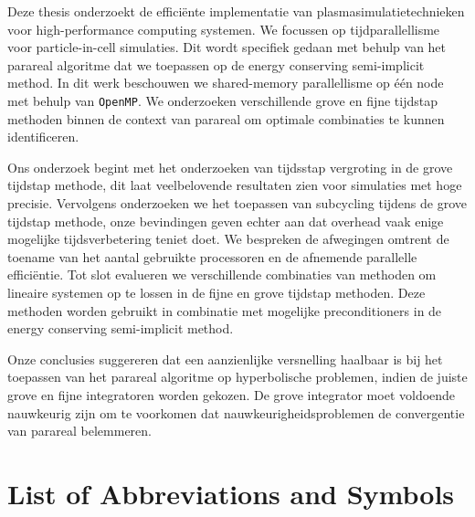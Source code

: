 \documentclass[master=wit, english]{kulemt}
\begin{document}
\begin{abstract*}
Deze thesis onderzoekt de efficiënte implementatie van plasmasimulatietechnieken voor high-performance computing systemen. We focussen op tijdparallellisme voor particle-in-cell simulaties. Dit wordt specifiek gedaan met behulp van het parareal algoritme dat we toepassen op de energy conserving semi-implicit method. In dit werk beschouwen we shared-memory parallellisme op één node met behulp van \texttt{OpenMP}. We onderzoeken verschillende grove en fijne tijdstap methoden binnen de context van parareal om optimale combinaties te kunnen identificeren.

Ons onderzoek begint met het onderzoeken van tijdsstap vergroting in de grove tijdstap methode, dit laat veelbelovende resultaten zien voor simulaties met hoge precisie. Vervolgens onderzoeken we het toepassen van subcycling tijdens de grove tijdstap methode, onze bevindingen geven echter aan dat overhead vaak enige mogelijke tijdsverbetering teniet doet. We bespreken de afwegingen omtrent de toename van het aantal gebruikte processoren en de afnemende parallelle efficiëntie. Tot slot evalueren we verschillende combinaties van methoden om lineaire systemen op te lossen in de fijne en grove tijdstap methoden. Deze methoden worden gebruikt in combinatie met mogelijke preconditioners in de energy conserving semi-implicit method.

Onze conclusies suggereren dat een aanzienlijke versnelling haalbaar is bij het toepassen van het parareal algoritme op hyperbolische problemen, indien de juiste grove en fijne integratoren worden gekozen. De grove integrator moet voldoende nauwkeurig zijn om te voorkomen dat nauwkeurigheidsproblemen de convergentie van parareal belemmeren. 
\end{abstract*}

\listoffiguresandtables
\chapter{List of Abbreviations and Symbols}
\end{document}
